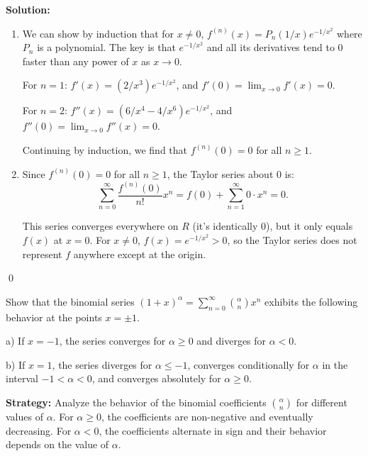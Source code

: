 \bigskip\noindent\textbf{Solution:}
\begin{enumerate}[label=(\alph*)]
\item We can show by induction that for \( x \neq 0 \), \( f^{(n)}(x) = P_n(1/x)e^{-1/x^2} \) where \( P_n \) is a polynomial. The key is that \( e^{-1/x^2} \) and all its derivatives tend to 0 faster than any power of \( x \) as \( x \to 0 \).

For \( n = 1 \): \( f'(x) = (2/x^3)e^{-1/x^2} \), and \( f'(0) = \lim_{x \to 0} f'(x) = 0 \).

For \( n = 2 \): \( f''(x) = (6/x^4 - 4/x^6)e^{-1/x^2} \), and \( f''(0) = \lim_{x \to 0} f''(x) = 0 \).

Continuing by induction, we find that \( f^{(n)}(0) = 0 \) for all \( n \geq 1 \).

\item Since \( f^{(n)}(0) = 0 \) for all \( n \geq 1 \), the Taylor series about 0 is:
\[\sum_{n=0}^{\infty} \frac{f^{(n)}(0)}{n!}x^n = f(0) + \sum_{n=1}^{\infty} 0 \cdot x^n = 0.\]

This series converges everywhere on \( R \) (it's identically 0), but it only equals \( f(x) \) at \( x = 0 \). For \( x \neq 0 \), \( f(x) = e^{-1/x^2} > 0 \), so the Taylor series does not represent \( f \) anywhere except at the origin.
\end{enumerate}\qed


\begin{problembox}
\begin{problemstatement}
Show that the binomial series \( (1 + x)^\alpha = \sum_{n=0}^\infty \binom{\alpha}{n} x^n \) exhibits the following behavior at the points \( x = \pm 1 \).

a) If \( x = -1 \), the series converges for \( \alpha \geq 0 \) and diverges for \( \alpha < 0 \).

b) If \( x = 1 \), the series diverges for \( \alpha \leq -1 \), converges conditionally for \( \alpha \) in the interval \(-1 < \alpha < 0 \), and converges absolutely for \( \alpha \geq 0 \).
\end{problemstatement}
\end{problembox}

\noindent\textbf{Strategy:} Analyze the behavior of the binomial coefficients \( \binom{\alpha}{n} \) for different values of \( \alpha \). For \( \alpha \geq 0 \), the coefficients are non-negative and eventually decreasing. For \( \alpha < 0 \), the coefficients alternate in sign and their behavior depends on the value of \( \alpha \).

